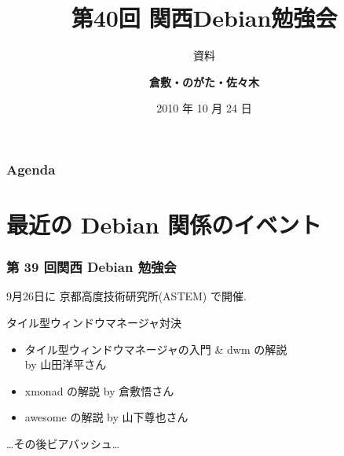 \documentclass[cjk,dvipdfmx,12pt,%
hyperref={bookmarks=true,bookmarksnumbered=true,bookmarksopen=false,%
colorlinks=false,%
pdftitle={第40回 関西Debian勉強会},%
pdfauthor={倉敷・のがた・佐々木},%
pdfsubject={資料},%
}]{beamer}
\title{第40回 関西Debian勉強会}
\subtitle{{\scriptsize 資料}}
\author[佐々木 洋平]{{\large\bf 倉敷・のがた・佐々木}}
\institute[Debian JP]{{\normalsize\tt 関西Debian勉強会}}
\date{{\small 2010 年 10 月 24 日}}
\begin{document}
\settitleslide
\begin{frame}
\titlepage
\end{frame}
\setdefaultslide

\begin{frame}[fragile]
\frametitle{Agenda}

\tableofcontents

\end{frame}

\section{最近の Debian 関係のイベント}


 

\begin{frame}[fragile]
\frametitle{第 39 回関西 Debian 勉強会}

9月26日に 京都高度技術研究所(ASTEM) で開催.

\begin{block}{タイル型ウィンドウマネージャ対決}
\begin{itemize}
\item タイル型ウィンドウマネージャの入門 \& dwm の解説 　\\ by 山田洋平さん
\item xmonad の解説 by 倉敷悟さん
\item awesome の解説 by 山下尊也さん
\end{itemize}
\end{block}

\dots{}その後ビアバッシュ\dots{}

\end{frame}
\end{document}
